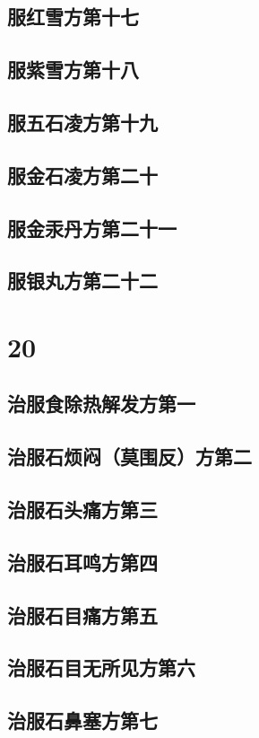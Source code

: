 \documentclass[a4paper,12pt,UTF8,twoside]{ctexbook}
\begin{document}
\chapter{服红雪方第十七}
\chapter{服紫雪方第十八}
\chapter{服五石凌方第十九}
\chapter{服金石凌方第二十}
\chapter{服金汞丹方第二十一}
\chapter{服银丸方第二十二}

\part{20}
\chapter{治服食除热解发方第一}
\chapter{治服石烦闷（莫围反）方第二}
\chapter{治服石头痛方第三}
\chapter{治服石耳鸣方第四}
\chapter{治服石目痛方第五}
\chapter{治服石目无所见方第六}
\chapter{治服石鼻塞方第七}
\end{document}

